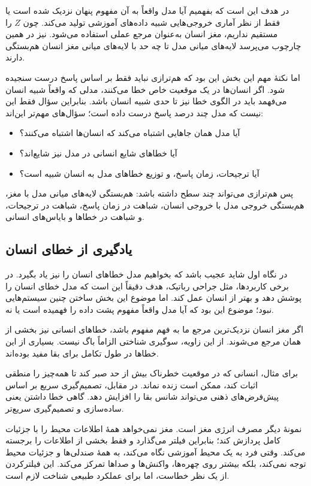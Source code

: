 در  هدف این است که بفهمیم آیا مدل واقعاً به آن مفهوم پنهان نزدیک شده است یا فقط از نظر آماری خروجی‌هایی شبیه داده‌های آموزشی تولید می‌کند. چون \(Z\) را مستقیم نداریم، مغز انسان به‌عنوان مرجع عملی استفاده می‌شود.  نیز در همین چارچوب می‌پرسد لایه‌های میانی مدل تا چه حد با لایه‌های میانی مغز انسان هم‌بستگی دارند.

اما نکتهٔ مهم این بخش این بود که هم‌ترازی نباید فقط بر اساس پاسخ درست سنجیده شود. اگر انسان‌ها در یک موقعیت خاص خطا می‌کنند، مدلی که واقعاً شبیه انسان می‌فهمد باید در الگوی خطا نیز تا حدی شبیه انسان باشد. بنابراین سؤال فقط این نیست که مدل چند درصد پاسخ درست داده است؛ سؤال‌های مهم‌تر این‌اند:

\begin{itemize}
  \item آیا مدل همان جاهایی اشتباه می‌کند که انسان‌ها اشتباه می‌کنند؟
  \item آیا خطاهای شایع انسانی در مدل نیز شایع‌اند؟
  \item آیا ترجیحات، زمان پاسخ، و توزیع خطاهای مدل به انسان شبیه است؟
\end{itemize}

پس هم‌ترازی می‌تواند چند سطح داشته باشد: هم‌بستگی لایه‌های میانی مدل با مغز، هم‌بستگی خروجی مدل با خروجی انسان، شباهت در زمان پاسخ، شباهت در ترجیحات، و شباهت در خطاها و بایاس‌های انسانی.

\subsection{یادگیری از خطای انسان}
در نگاه اول شاید عجیب باشد که بخواهیم مدل خطاهای انسان را نیز یاد بگیرد. در برخی کاربردها، مثل جراحی رباتیک، هدف دقیقاً این است که مدل خطای انسان را پوشش دهد و بهتر از انسان عمل کند. اما موضوع این بخش ساختن چنین سیستم‌هایی نبود؛ موضوع این بود که آیا مدل واقعاً مفهوم پشت داده را فهمیده است یا نه.

اگر مغز انسان نزدیک‌ترین مرجع ما به فهم مفهوم باشد، خطاهای انسانی نیز بخشی از همان مرجع می‌شوند. از این زاویه، سوگیری شناختی الزاماً باگ نیست. بسیاری از این خطاها در طول تکامل برای بقا مفید بوده‌اند.

برای مثال، انسانی که در موقعیت خطرناک بیش از حد صبر کند تا همه‌چیز را منطقی اثبات کند، ممکن است زنده نماند. در مقابل، تصمیم‌گیری سریع بر اساس پیش‌فرض‌های ذهنی می‌تواند شانس بقا را افزایش دهد. گاهی خطا داشتن یعنی ساده‌سازی و تصمیم‌گیری سریع‌تر.

نمونهٔ دیگر مصرف انرژی مغز است. مغز نمی‌خواهد همهٔ اطلاعات محیط را با جزئیات کامل پردازش کند؛ بنابراین فیلتر می‌گذارد و فقط بخشی از اطلاعات را برجسته می‌کند. وقتی فرد به یک محیط آموزشی نگاه می‌کند، به همهٔ صندلی‌ها و جزئیات محیط توجه نمی‌کند، بلکه بیشتر روی چهره‌ها، واکنش‌ها و صداها تمرکز می‌کند. این فیلترکردن از یک نظر خطاست، اما برای عملکرد طبیعی شناخت لازم است.

